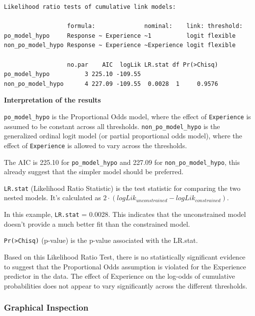 \documentclass[
  letterpaper,
  DIV=11,
  numbers=noendperiod]{scrartcl}
\begin{document}
\begin{verbatim}
Likelihood ratio tests of cumulative link models:
 
                  formula:              nominal:    link: threshold:
po_model_hypo     Response ~ Experience ~1          logit flexible  
non_po_model_hypo Response ~ Experience ~Experience logit flexible  

                  no.par    AIC  logLik LR.stat df Pr(>Chisq)
po_model_hypo          3 225.10 -109.55                      
non_po_model_hypo      4 227.09 -109.55  0.0028  1     0.9576
\end{verbatim}

\textbf{Interpretation of the results}

\texttt{po\_model\_hypo} is the Proportional Odds model, where the
effect of \texttt{Experience} is assumed to be constant across all
thresholds. \texttt{non\_po\_model\_hypo} is the generalized ordinal
logit model (or partial proportional odds model), where the effect of
\texttt{Experience} is allowed to vary across the thresholds.

The AIC is 225.10 for \texttt{po\_model\_hypo} and 227.09 for
\texttt{non\_po\_model\_hypo}, this already suggest that the simpler
model should be preferred.

\texttt{LR.stat} (Likelihood Ratio Statistic) is the test statistic for
comparing the two nested models. It's calculated as
\(2 \cdot (logLik_{unconstrained} −logLik_{constrained})\).

In this example, \texttt{LR.stat} = 0.0028. This indicates that the
unconstrained model doesn't provide a much better fit than the
constrained model.

\texttt{Pr(\textgreater{}Chisq)} (p-value) is the p-value associated
with the LR.stat.

Based on this Likelihood Ratio Test, there is no statistically
significant evidence to suggest that the Proportional Odds assumption is
violated for the Experience predictor in the data. The effect of
Experience on the log-odds of cumulative probabilities does not appear
to vary significantly across the different thresholds.

\hypertarget{graphical-inspection}{%
\subsubsection*{Graphical Inspection}\label{graphical-inspection}}
\end{document}

